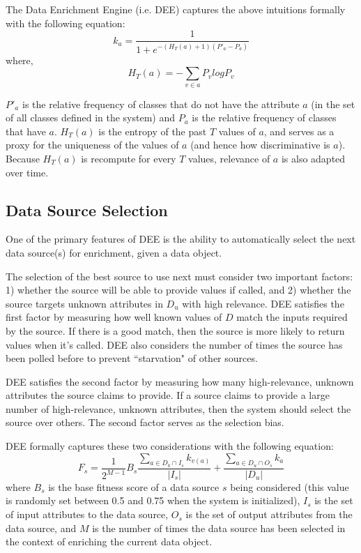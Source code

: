 \documentclass{article}
\begin{document}
The Data Enrichment Engine (i.e. DEE) captures the above intuitions formally with the following equation:
\begin{equation}
k_a= \frac{1}{1+ e^{-(H_{T}(a) +1)(P'_a - P_a)}}
\end{equation}
where, 
\begin{equation}
H_{T}(a)= - \displaystyle\sum\limits_{v \in a} P_v log P_v
\end{equation}

$P'_a$ is the relative frequency of classes that do not have the attribute $a$ (in the set of all classes 
defined in the system) and $P_a$ is the relative frequency of classes that have $a$. $H_{T}(a)$ is the entropy 
of the past $T$ values of $a$, and serves as a proxy for the uniqueness of the values of $a$ (and hence how 
discriminative is $a$). Because $H_{T}(a)$ is recompute for every $T$ values, relevance of $a$ is also adapted
over time.


\subsection{Data Source Selection} 

One of the primary features of DEE is the ability to automatically select the next data source(s) for 
enrichment, given a data object. 

The selection of the best source to use next must consider two important factors: 1) whether the source will 
be able to provide values if called, and 2) whether the source targets unknown attributes in $D_u$ with high 
relevance. DEE satisfies the first factor by measuring how well known values of $D$ match the inputs required 
by the source. If there is a good match, then the source is more likely to return values when it's called. DEE
also considers the number of times the source has been polled before to prevent ``starvation" of other sources. 

DEE satisfies the second factor by measuring how many high-relevance, unknown attributes the source claims 
to provide. If a source claims to provide a large number of high-relevance, unknown attributes, then the 
system should select the source over others. The second factor serves as the selection bias. 

DEE formally captures these two considerations with the following equation:
\begin{equation}
    F_s = \frac{1}{2^{M-1}}B_s \frac{\displaystyle\sum\limits_{a \in D_k \cap I_s} k_{v(a)}}{|I_s|} 
    	+ \frac{\displaystyle\sum\limits_{a \in D_u \cap O_s} k_{a}}{|D_u|}
\end{equation}
where $B_s$ is the base fitness score of a data source $s$ being considered (this value is randomly set between 
0.5 and 0.75 when the system is initialized), $I_s$ is the set of input attributes to the data source, $O_s$ is 
the set of output attributes from the data source, and $M$ is the number of times the data source has been 
selected in the context of enriching the current data object.
\end{document}
